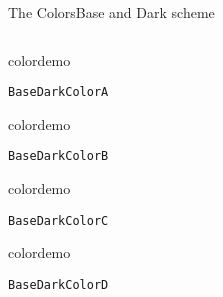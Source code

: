 \begin{frame}{The Colors}{Base and Dark scheme}
\begin{columns}
\begin{column}{0.5\textwidth}
\begin{beamercolorbox}[dp=0pt,sep=0em,wd=15cm,ht=10cm]{}
\begin{beamercolorbox}[sep=0em,wd=2cm,ht=2cm]{colordemo}
\end{beamercolorbox}\quad\texttt{BaseDarkColorA}\hfill\newline%
%
\begin{beamercolorbox}[sep=0em,wd=2cm,ht=2cm]{colordemo}%
\end{beamercolorbox}\quad\texttt{BaseDarkColorB}\hfill\newline%
%
\begin{beamercolorbox}[sep=0em,wd=2cm,ht=2cm]{colordemo}%
\end{beamercolorbox}\quad\texttt{BaseDarkColorC}\hfill\newline%
%
\begin{beamercolorbox}[sep=0em,wd=2cm,ht=2cm]{colordemo}%
\end{beamercolorbox}\quad\texttt{BaseDarkColorD}%
\end{beamercolorbox}%
\end{column}
\end{columns}
\end{frame}
%
%
%
%
%
